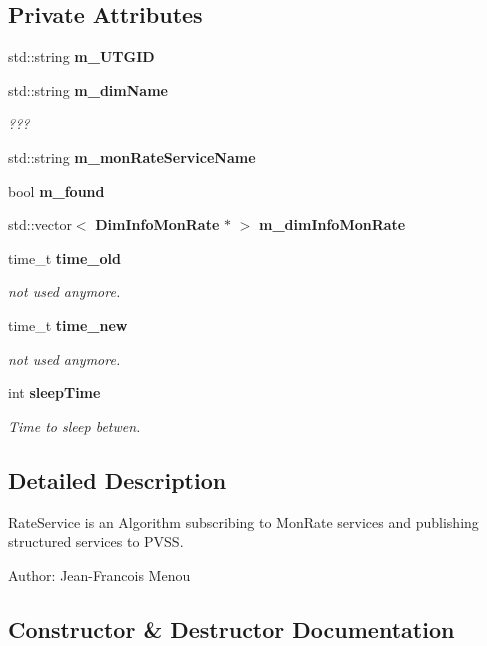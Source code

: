 \subsection*{Private Attributes}
\begin{CompactItemize}
\item 
std::string {\bf m\_\-UTGID}
\item 
std::string {\bf m\_\-dim\-Name}
\begin{CompactList}\small\item\em ??? \item\end{CompactList}\item 
std::string {\bf m\_\-mon\-Rate\-Service\-Name}
\item 
bool {\bf m\_\-found}
\item 
std::vector$<$ {\bf Dim\-Info\-Mon\-Rate} $\ast$ $>$ {\bf m\_\-dim\-Info\-Mon\-Rate}
\item 
time\_\-t {\bf time\_\-old}
\begin{CompactList}\small\item\em not used anymore. \item\end{CompactList}\item 
time\_\-t {\bf time\_\-new}
\begin{CompactList}\small\item\em not used anymore. \item\end{CompactList}\item 
int {\bf sleep\-Time}
\begin{CompactList}\small\item\em Time to sleep betwen. \item\end{CompactList}\end{CompactItemize}


\subsection{Detailed Description}
Rate\-Service is an Algorithm subscribing to Mon\-Rate services and publishing structured services to PVSS.

\begin{Desc}
\item[Author:]Jean-Francois Menou \end{Desc}




\subsection{Constructor \& Destructor Documentation}
